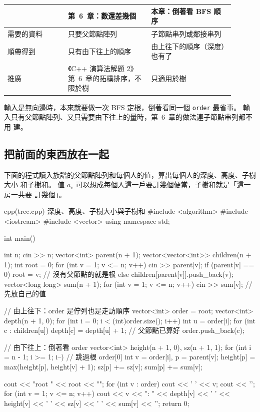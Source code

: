 \begin{center}
\begin{tabular}{p{0.24\linewidth}p{0.33\linewidth}p{0.33\linewidth}}
\toprule
 & 第~6~章：數還差幾個 & 本章：倒著看 BFS 順序 \\
\midrule
需要的資料 & 只要父節點陣列 & 子節點串列或鄰接串列 \\
順帶得到 & 只有由下往上的順序 & 由上往下的順序（深度）也有了 \\
推廣 & 《C++ 演算法解題 2》第~6~章的拓樸排序，不限於樹 & 只適用於樹 \\
\bottomrule
\end{tabular}
\end{center}

輸入是無向邊時，本來就要做一次 BFS 定根，倒著看同一個 \texttt{order} 最省事。
輸入只有父節點陣列、又只需要由下往上的量時，第~6~章的做法連子節點串列都不用
建。

\subsection{把前面的東西放在一起}

下面的程式讀入族譜的父節點陣列和每個人的值，算出每個人的深度、高度、子樹大小
和子樹和。 值 $a_v$ 可以想成每個人這一戶要訂幾個便當，子樹和就是「這一房一共要
訂幾個」。

\begin{example}[label=ex:tree-basic]{cpp}{(tree.cpp) 深度、高度、子樹大小與子樹和}
#include <algorithm>
#include <iostream>
#include <vector>
using namespace std;

int main() {
    int n;
    cin >> n;
    vector<int> parent(n + 1);
    vector<vector<int>> children(n + 1);
    int root = 0;
    for (int v = 1; v <= n; v++) {
        cin >> parent[v];
        if (parent[v] == 0) {
            root = v;                       // 沒有父節點的就是根
        } else {
            children[parent[v]].push_back(v);
        }
    }
    vector<long long> sum(n + 1);
    for (int v = 1; v <= n; v++) {
        cin >> sum[v];                      // 先放自己的值
    }

    // 由上往下：order 是佇列也是走訪順序
    vector<int> order = {root};
    vector<int> depth(n + 1, 0);
    for (int i = 0; i < (int)order.size(); i++) {
        int u = order[i];
        for (int c : children[u]) {
            depth[c] = depth[u] + 1;        // 父節點已算好
            order.push_back(c);
        }
    }

    // 由下往上：倒著看 order
    vector<int> height(n + 1, 0), sz(n + 1, 1);
    for (int i = n - 1; i >= 1; i--) {      // 跳過根 order[0]
        int v = order[i], p = parent[v];
        height[p] = max(height[p], height[v] + 1);
        sz[p] += sz[v];
        sum[p] += sum[v];
    }

    cout << "root " << root << "\norder";
    for (int v : order) {
        cout << ' ' << v;
    }
    cout << '\n';
    for (int v = 1; v <= n; v++) {
        cout << v << ": " << depth[v] << ' ' << height[v] << ' '
             << sz[v] << ' ' << sum[v] << '\n';
    }
    return 0;
}
\end{example}

